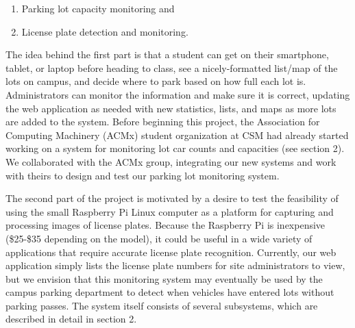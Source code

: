 \documentclass[11pt, oneside, fullpage, doublespace]{article}
\begin{document}
\begin{enumerate}
\item Parking lot capacity monitoring and
\item License plate detection and monitoring.
\end{enumerate}

The idea behind the first part is that a student can get on their smartphone, tablet, or laptop before heading to class, see a nicely-formatted list/map of the lots on campus, and decide where to park based on how full each lot is. Administrators can monitor the information and make sure it is correct, updating the web application as needed with new statistics, lists, and maps as more lots are added to the system. Before beginning this project, the Association for Computing Machinery (ACMx) student organization at CSM had already started working on a system for monitoring lot car counts and capacities (see section 2). We collaborated with the ACMx group, integrating our new systems and work with theirs to design and test our parking lot monitoring system.

The second part of the project is motivated by a desire to test the feasibility of using the small Raspberry Pi Linux computer as a platform for capturing and processing images of license plates. Because the Raspberry Pi is inexpensive (\$25-\$35 depending on the model), it could be useful in a wide variety of applications that require accurate license plate recognition. Currently, our web application simply lists the license plate numbers for site administrators to view, but we envision that this monitoring system may eventually be used by the campus parking department to detect when vehicles have entered lots without parking passes. The system itself consists of several subsystems, which are described in detail in section 2.
\end{document}
